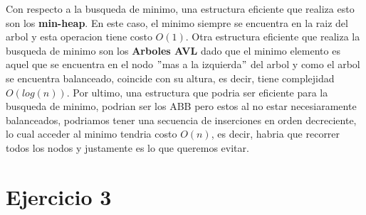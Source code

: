 \documentclass[10pt,a4paper]{article}
\begin{document}
\newline
\newline
Con respecto a la busqueda de minimo, una estructura eficiente que realiza esto son los \textbf{min-heap}. En este caso, el minimo siempre se encuentra en la raiz del arbol y esta operacion tiene costo $O(1)$. Otra estructura eficiente que realiza la busqueda de minimo son los \textbf{Arboles AVL} dado que el minimo elemento es aquel que se encuentra en el nodo $"$mas a la izquierda$"$ del arbol y como el arbol se encuentra balanceado, coincide con su altura, es decir, tiene complejidad $O(log(n))$. Por ultimo, una estructura que podria ser eficiente para la busqueda de minimo, podrian ser los ABB pero estos al no estar necesiaramente balanceados, podriamos tener una secuencia de inserciones en orden decreciente, lo cual acceder al minimo tendria costo $O(n)$, es decir, habria que recorrer todos los nodos y justamente es lo que queremos evitar.  


\newpage

\section{Ejercicio 3}
\end{document}
